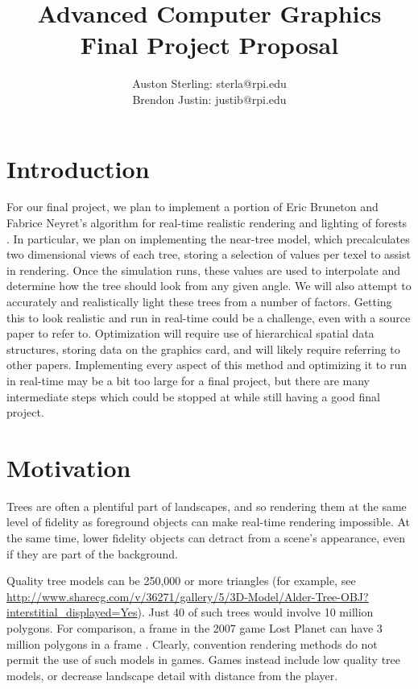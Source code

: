 \documentclass{article}
\begin{document}
\title{Advanced Computer Graphics Final Project Proposal}
\author{Auston Sterling: sterla@rpi.edu \\ Brendon Justin: justib@rpi.edu}
\date{}
\maketitle

\section{Introduction}
For our final project, we plan to implement a portion of Eric Bruneton and Fabrice Neyret's algorithm for real-time realistic rendering and lighting of forests \cite{trees}. In particular, we plan on implementing the near-tree model, which precalculates two dimensional views of each tree, storing a selection of values per texel to assist in rendering. Once the simulation runs, these values are used to interpolate and determine how the tree should look from any given angle. We will also attempt to accurately and realistically light these trees from a number of factors. Getting this to look realistic and run in real-time could be a challenge, even with a source paper to refer to. Optimization will require use of hierarchical spatial data structures, storing data on the graphics card, and will likely require referring to other papers. Implementing every aspect of this method and optimizing it to run in real-time may be a bit too large for a final project, but there are many intermediate steps which could be stopped at while still having a good final project.

\section{Motivation}
Trees are often a plentiful part of landscapes, and so rendering them at the same level of fidelity as foreground objects can make real-time rendering impossible.  At the same time, lower fidelity objects can detract from a scene's appearance, even if they are part of the background.  

Quality tree models can be 250,000 or more triangles
(for example, see \url{http://www.sharecg.com/v/36271/gallery/5/3D-Model/Alder-Tree-OBJ?interstitial_displayed=Yes}).  Just 40 of such trees would involve 10 million polygons.  For comparison, a frame in the 2007 game Lost Planet can have 3 million polygons in a frame \cite{many_polygons}.  Clearly, convention rendering methods do not permit the use of such models in games.  Games instead include low quality tree models, or decrease landscape detail with distance from the player.
\end{document}
